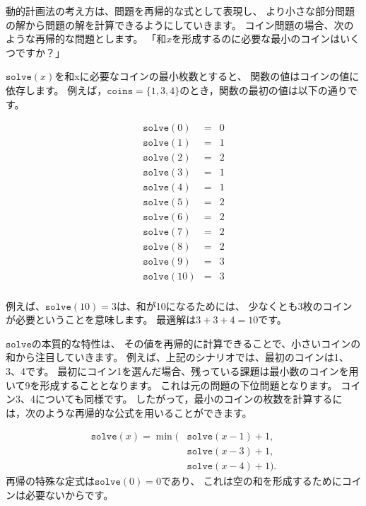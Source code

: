 動的計画法の考え方は、問題を再帰的な式として表現し、
より小さな部分問題の解から問題の解を計算できるようにしていきます。
コイン問題の場合、次のような再帰的な問題とします。
「和$x$を形成するのに必要な最小のコインはいくつですか？」

$\texttt{solve}(x)$を和xに必要なコインの最小枚数とすると、
関数の値はコインの値に依存します。
例えば，$\texttt{coins} = \{1,3,4\}$のとき，関数の最初の値は以下の通りです。

\[
\begin{array}{lcl}
\texttt{solve}(0) & = & 0 \\
\texttt{solve}(1) & = & 1 \\
\texttt{solve}(2) & = & 2 \\
\texttt{solve}(3) & = & 1 \\
\texttt{solve}(4) & = & 1 \\
\texttt{solve}(5) & = & 2 \\
\texttt{solve}(6) & = & 2 \\
\texttt{solve}(7) & = & 2 \\
\texttt{solve}(8) & = & 2 \\
\texttt{solve}(9) & = & 3 \\
\texttt{solve}(10) & = & 3 \\
\end{array}
\]

例えば、$\texttt{solve}(10)=3$は、和が10になるためには、
少なくとも3枚のコインが必要ということを意味します。
最適解は$3+3+4=10$です。

$\texttt{solve}$の本質的な特性は、
その値を再帰的に計算できることで、小さいコインの和から注目していきます。
例えば、上記のシナリオでは、最初のコインは1、3、4です。
最初にコイン1を選んだ場合、残っている課題は最小数のコインを用いて9を形成することとなります。
これは元の問題の下位問題となります。
コイン3、4についても同様です。
したがって，最小のコインの枚数を計算するには，次のような再帰的な公式を用いることができます。

\begin{equation*}
\begin{split}
\texttt{solve}(x) = \min( & \texttt{solve}(x-1)+1, \\
                           & \texttt{solve}(x-3)+1, \\
                           & \texttt{solve}(x-4)+1).
\end{split}
\end{equation*}
再帰の特殊な定式は$\texttt{solve}(0)=0$であり、
これは空の和を形成するためにコインは必要ないからです。

